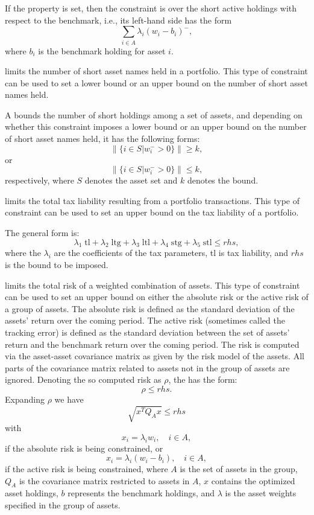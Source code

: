    If the  property is set, 
   then the constraint is over the short active holdings with respect to the benchmark, i.e., its left-hand side has the form 
   \[
        \sum_{i\in A}\lambda_i (w_i-b_i)^-,
   \]
   where $b_i$ is the benchmark holding for asset $i$.

    limits the number of short asset names held in a portfolio. 
    This type of constraint can be used to set a lower bound or an upper bound on the number of short asset names held. 

    A  bounds the number of short holdings among a set of assets, 
    and depending on whether this constraint imposes a lower bound or an upper bound on the number of short asset names held, 
    it has the following forms: 
    \[
        \|\{i\in S|w_i^->0\}\| \ge k,
    \]
    or
    \[
        \|\{i\in S|w_i^->0\}\| \le k,
    \]
    respectively, where $S$ denotes the asset set and $k$ denotes the bound. 

   limits the total tax liability resulting from a portfolio transactions. 
   This type of constraint can be used to set an upper bound on the tax liability of a portfolio. 

   The general form is: 
   \[
       \lambda_1\;\text{tl}+\lambda_2\;\text{ltg}+\lambda_3\;\text{ltl}+\lambda_4\;\text{stg}+\lambda_5\;\text{stl}\le rhs,
   \]
   where the $\lambda_i$ are the coefficients of the tax parameters, tl is tax liability, and $rhs$ is the bound to be imposed. 

   limits the total risk of a weighted combination of assets. 
   This type of constraint can be used to set an upper bound on either the absolute risk or the active risk of a group of assets. 
   The absolute risk is defined as the standard deviation of the assets' return over the coming period. 
   The active risk (sometimes called the tracking error) is defined as the standard deviation between the set of assets' return 
   and the benchmark return over the coming period. 
   The risk is computed via the asset-asset covariance matrix as given by the risk model of the assets. 
   All parts of the covariance matrix related to assets not in the group of assets are ignored. 
   Denoting the so computed risk as $\rho$, the  has the form: 
   \[
       \rho \le rhs.
   \]
   Expanding $\rho$ we have
   \[
       \sqrt{x^T Q_A x} \le rhs
   \]
   with
   \[
       x_i = \lambda_i w_i, \quad i \in A,
   \]
   if the absolute risk is being constrained, or
   \[
       x_i = \lambda_i (w_i-b_i), \quad i \in A,
   \]
   if the active risk is being constrained, where $A$ is the set of assets in the group, 
   $Q_A$ is the covariance matrix restricted to assets in $A$, 
   $x$ contains the optimized asset holdings, 
   $b$ represents the benchmark holdings, 
   and $\lambda$ is the asset weights specified in the group of assets. 

